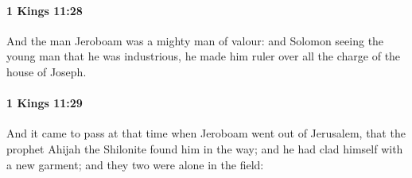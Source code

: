 		\paragraph{1 Kings 11:28} %
			\label{1KINGS-11-28}

			And the man Jeroboam was a mighty man of valour: and Solomon seeing the young man that he was industrious, he made him ruler over all the charge of the house of Joseph.


		\paragraph{1 Kings 11:29} %
			\label{1KINGS-11-29}

			And it came to pass at that time when Jeroboam went out of Jerusalem, that the prophet Ahijah the Shilonite found him in the way; and he had clad himself with a new garment; and they two were alone in the field:

